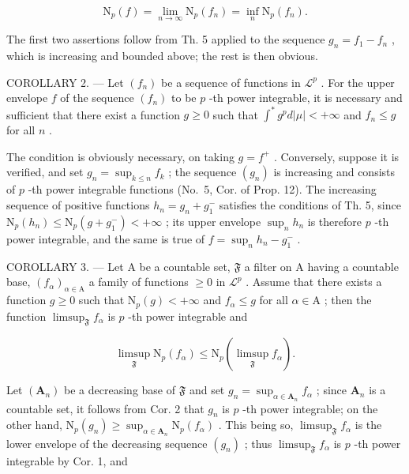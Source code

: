 \[
\mathrm{N} _ {p} (f) = \lim _ {n \rightarrow \infty} \mathrm{N} _ {p} (f _ {n}) = \inf _ {n} \mathrm{N} _ {p} (f _ {n}).
\]

The first two assertions follow from Th. 5 applied to the sequence \(g_{n} = f_{1} - f_{n}\) , which is increasing and bounded above; the rest is then obvious.

COROLLARY 2. --- Let \((f_n)\) be a sequence of functions in \(\mathcal{L}^p\) . For the upper envelope \(f\) of the sequence \((f_n)\) to be \(p\) -th power integrable, it is necessary and sufficient that there exist a function \(g \geqslant 0\) such that \(\int^{*} g^p d|\mu| < +\infty\) and \(f_n \leqslant g\) for all \(n\) .

The condition is obviously necessary, on taking \(g = f^{+}\) . Conversely, suppose it is verified, and set \(g_{n} = \sup_{k\leqslant n}f_{k}\) ; the sequence \((g_{n})\) is increasing and consists of \(p\) -th power integrable functions (No.~5, Cor. of Prop. 12). The increasing sequence of positive functions \(h_n = g_n + g_1^-\) satisfies the conditions of Th. 5, since \(\mathrm{N}_p(h_n)\leqslant \mathrm{N}_p(g + g_1^-) < +\infty\) ; its upper envelope \(\sup_{n}h_{n}\) is therefore \(p\) -th power integrable, and the same is true of \(f = \sup_{n}h_{n} - g_{1}^{-}\) .

COROLLARY 3. --- Let A be a countable set, \(\mathfrak{F}\) a filter on A having a countable base, \((f_{\alpha})_{\alpha \in \mathrm{A}}\) a family of functions \(\geqslant 0\) in \(\mathcal{L}^p\) . Assume that there exists a function \(g \geqslant 0\) such that \(\mathrm{N}_p(g) < +\infty\) and \(f_{\alpha} \leqslant g\) for all \(\alpha \in \mathrm{A}\) ; then the function \(\limsup_{\mathfrak{F}} f_{\alpha}\) is \(p\) -th power integrable and

\[
\limsup _ {\mathfrak {F}} \mathrm{N} _ {p} (f _ {\alpha}) \leqslant \mathrm{N} _ {p} (\limsup _ {\mathfrak {F}} f _ {\alpha}).\tag{12}
\]

Let \((\mathbf{A}_n)\) be a decreasing base of \(\mathfrak{F}\) and set \(g_{n} = \sup_{\alpha \in \mathbf{A}_{n}}f_{\alpha}\) ; since \(\mathbf{A}_n\) is a countable set, it follows from Cor. 2 that \(g_{n}\) is \(p\) -th power integrable; on the other hand, \(\mathrm{N}_p(g_n)\geqslant \sup_{\alpha \in \mathbf{A}_n}\mathrm{N}_p(f_\alpha)\) . This being so, \(\limsup_{\mathfrak{F}}f_{\alpha}\) is the lower envelope of the decreasing sequence \((g_n)\) ; thus \(\limsup_{\mathfrak{F}}f_{\alpha}\) is \(p\) -th power integrable by Cor. 1, and


